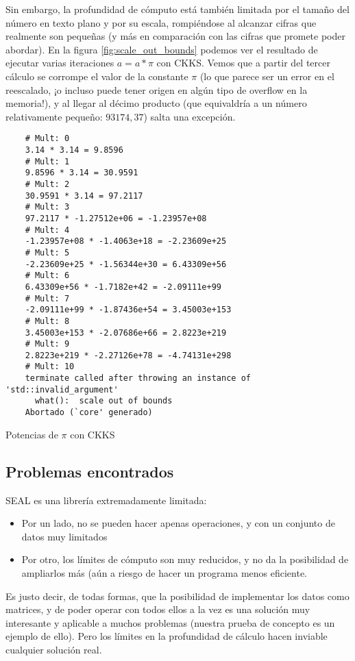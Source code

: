 Sin embargo, la profundidad de cómputo está también limitada por el tamaño del número en texto plano y por su escala, rompiéndose al alcanzar cifras que realmente son pequeñas (y más en comparación con las cifras que promete poder abordar). En la figura \ref{fig:scale_out_bounds} podemos ver el resultado de ejecutar varias iteraciones $a = a*\pi$ con CKKS. Vemos que a partir del tercer cálculo se corrompe el valor de la constante $\pi$ (lo que parece ser un error en el reescalado, ¡o incluso puede tener origen en algún tipo de overflow en la memoria!), y al llegar al décimo producto (que equivaldría a un número relativamente pequeño: $93174,37$) salta una excepción.

\begin{listing}
    \begin{verbatim}
    # Mult: 0
    3.14 * 3.14 = 9.8596
    # Mult: 1
    9.8596 * 3.14 = 30.9591
    # Mult: 2
    30.9591 * 3.14 = 97.2117
    # Mult: 3
    97.2117 * -1.27512e+06 = -1.23957e+08
    # Mult: 4
    -1.23957e+08 * -1.4063e+18 = -2.23609e+25
    # Mult: 5
    -2.23609e+25 * -1.56344e+30 = 6.43309e+56
    # Mult: 6
    6.43309e+56 * -1.7182e+42 = -2.09111e+99
    # Mult: 7
    -2.09111e+99 * -1.87436e+54 = 3.45003e+153
    # Mult: 8
    3.45003e+153 * -2.07686e+66 = 2.8223e+219
    # Mult: 9
    2.8223e+219 * -2.27126e+78 = -4.74131e+298
    # Mult: 10
    terminate called after throwing an instance of 'std::invalid_argument'
      what():  scale out of bounds
    Abortado (`core' generado)
    \end{verbatim}
    \caption{Potencias de $\pi$ con CKKS}
    \label{fig:scale_out_bounds}
\end{listing}

\subsection{Problemas encontrados}

SEAL es una librería extremadamente limitada:

\begin{itemize}
    \item Por un lado, no se pueden hacer apenas operaciones, y con un conjunto de datos muy limitados
    \item Por otro, los límites de cómputo son muy reducidos, y no da la posibilidad de ampliarlos más (aún a riesgo de hacer un programa menos eficiente.
\end{itemize}

Es justo decir, de todas formas, que la posibilidad de implementar los datos como matrices, y de poder operar con todos ellos a la vez es una solución muy interesante y aplicable a muchos problemas (nuestra prueba de concepto es un ejemplo de ello). Pero los límites en la profundidad de cálculo hacen inviable cualquier solución real.

